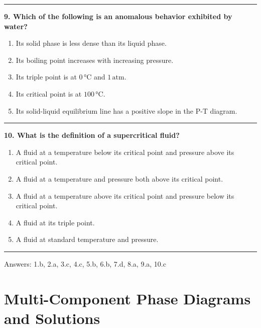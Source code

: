 \documentclass[
  9pt,
]{extbook}
\providecommand{\tightlist}{%
  \setlength{\itemsep}{0pt}\setlength{\parskip}{0pt}}
\theoremstyle{definition}
\theoremstyle{definition}
\theoremstyle{definition}
\theoremstyle{remark}
\begin{document}
\begin{center}\rule{0.5\linewidth}{0.5pt}\end{center}

\textbf{9. Which of the following is an anomalous behavior exhibited by water?}

\begin{enumerate}
\def\labelenumi{\alph{enumi}.}
\tightlist
\item
  Its solid phase is less dense than its liquid phase.
\item
  Its boiling point increases with increasing pressure.
\item
  Its triple point is at \(0\,\text{°C}\) and \(1\,\text{atm}\).
\item
  Its critical point is at \(100\,\text{°C}\).
\item
  Its solid-liquid equilibrium line has a positive slope in the P-T diagram.
\end{enumerate}

\begin{center}\rule{0.5\linewidth}{0.5pt}\end{center}

\textbf{10. What is the definition of a supercritical fluid?}

\begin{enumerate}
\def\labelenumi{\alph{enumi}.}
\tightlist
\item
  A fluid at a temperature below its critical point and pressure above its critical point.
\item
  A fluid at a temperature and pressure both above its critical point.
\item
  A fluid at a temperature above its critical point and pressure below its critical point.
\item
  A fluid at its triple point.
\item
  A fluid at standard temperature and pressure.
\end{enumerate}

\begin{center}\rule{0.5\linewidth}{0.5pt}\end{center}

Answers: 1.b, 2.a, 3.c, 4.c, 5.b, 6.b, 7.d, 8.a, 9.a, 10.c

\renewcommand*{\standardstate}{{-\kern-6pt{\ominus}\kern-6pt-}}

\hypertarget{MCPhaseDiagrams}{%
\chapter{Multi-Component Phase Diagrams and Solutions}\label{MCPhaseDiagrams}}
\end{document}
